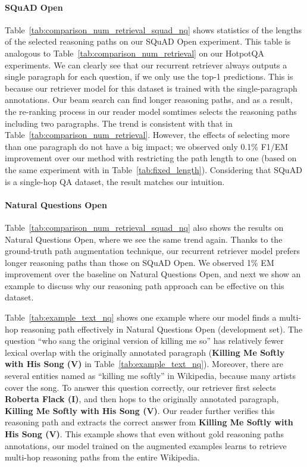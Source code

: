 \documentclass{article} \usepackage{iclr2020_conference,times}
\begin{document}
\paragraph{SQuAD Open}

Table~\ref{tab:comparison_num_retrieval_squad_nq} shows statistics of the lengths of the selected reasoning paths on our SQuAD Open experiment.
This table is analogous to Table~\ref{tab:comparison_num_retrieval} on our HotpotQA experiments.
We can clearly see that our recurrent retriever always outputs a single paragraph for each question, if we only use the top-1 predictions.
This is because our retriever model for this dataset is trained with the single-paragraph annotations.
Our beam search can find longer reasoning paths, and as a result, the re-ranking process in our reader model somtimes selects the reasoning paths including two paragraphs.
The trend is consistent with that in Table~\ref{tab:comparison_num_retrieval}.
However, the effects of selecting more than one paragraph do not have a big impact; we observed only 0.1\% F1/EM improvement over our method with restricting the path length to one (based on the same experiment with  in Table~\ref{tab:fixed_length}).
Considering that SQuAD is a single-hop QA dataset, the result matches our intuition.

\paragraph{Natural Questions Open}

Table~\ref{tab:comparison_num_retrieval_squad_nq} also shows the results on Natural Questions Open, where we see the same trend again.
Thanks to the ground-truth path augmentation technique, our recurrent retriever model prefers longer reasoning paths than those on SQuAD Open.
We observed 1\% EM improvement over the  baseline on Natural Questions Open, and next we show an example to discuss why our reasoning path approach can be effective on this dataset.

Table~\ref{tab:example_text_nq} shows one example where our model finds a multi-hop reasoning path effectively in Natural Questions Open (development set).
The question ``who sang the original version of killing me so'' has relatively fewer lexical overlap with the originally annotated paragraph ({\bf Killing Me Softly with His Song (V)} in Table~\ref{tab:example_text_nq}).
Moreover, there are several entities named as ``killing me softly'' in Wikipedia, because many artists cover the song. 
To answer this question correctly, our retriever first selects {\bf Roberta Flack (I)}, and then hops to the originally annotated paragraph, {\bf Killing Me Softly with His Song (V)}. 
Our reader further verifies this reasoning path and extracts the correct answer from  {\bf Killing Me Softly with His Song (V)}.
This example shows that even without gold reasoning paths annotations, our model trained on the augmented examples learns to retrieve multi-hop reasoning paths from the entire Wikipedia.
\end{document}
